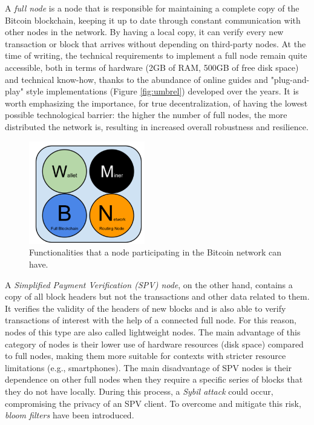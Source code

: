 A \textit{full node} is a node that is responsible for maintaining a complete copy of the Bitcoin blockchain, keeping it up to date through constant communication with other nodes in the network. By having a local copy, it can verify every new transaction or block that arrives without depending on third-party nodes. At the time of writing, the technical requirements to implement a full node remain quite accessible, both in terms of hardware (2GB of RAM, 500GB of free disk space) and technical know-how, thanks to the abundance of online guides and "plug-and-play" style implementations (Figure \ref{fig:umbrel}) developed over the years. It is worth emphasizing the importance, for true decentralization, of having the lowest possible technological barrier: the higher the number of full nodes, the more distributed the network is, resulting in increased overall robustness and resilience. 
\begin{figure}
\centering
\includegraphics[width=0.45\textwidth]{Figures/bitcoin/tipo1.png}
\caption{Functionalities that a node participating in the Bitcoin network can have.}
\label{fig:nodo}
\end{figure}
A \textit{Simplified Payment Verification (SPV) node}, on the other hand, contains a copy of all block headers but not the transactions and other data related to them. It verifies the validity of the headers of new blocks and is also able to verify transactions of interest with the help of a connected full node. For this reason, nodes of this type are also called lightweight nodes. The main advantage of this category of nodes is their lower use of hardware resources (disk space) compared to full nodes, making them more suitable for contexts with stricter resource limitations (e.g., smartphones). The main disadvantage of SPV nodes is their dependence on other full nodes when they require a specific series of blocks that they do not have locally. During this process, a \textit{Sybil attack} could occur, compromising the privacy of an SPV client. To overcome and mitigate this risk, \textit{bloom filters} have been introduced. \cite{bitcoinopsTransactionBloom}
